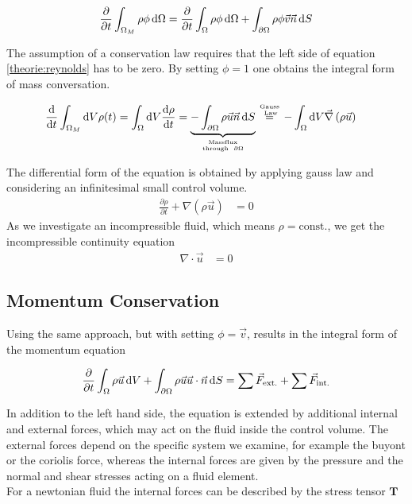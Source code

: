 \begin{align}
    \label{theorie:reynolds}
    \pdn[]{t} \int_{\Omega_M} \rho \phi \dif \Omega = \pdn[]{t}\int_{\Omega} \rho \phi \dif \Omega + \int_{\partial\Omega} \rho \phi \vec{v} \vec{n} \dif S
\end{align}

The assumption of a conservation law requires that the left side of equation \ref{theorie:reynolds} has to be zero.
By setting $\phi = 1$ one obtains the integral form of mass conversation.

\begin{align}
    \frac{\dif}{\dif t} \int_{\Omega_M}\dif V \rho(t) =  \int_{\Omega}\dif V \frac{\dif \rho}{\dif t}  &= \underbrace{-\int_{\partial \Omega}
     \rho \vec{u}\vec{n}\dif S}_{\text{Massflux} \atop \text{through \ } \partial \Omega} \stackrel{\text{Gauss} \atop \text{ Law}}{=}
      -\int_\Omega \dif V \vec{\nabla}\left(\rho \vec{u}\right)
\end{align}

The differential form of the equation is obtained by applying gauss law and considering an infinitesimal small control volume.
\begin{align}
     \frac{\partial \rho}{\partial t}  + \nabla \left(\rho \vec{u}\right) &= 0
\end{align}
As we investigate an incompressible fluid, which means $\rho = \text{const.}$, we get the incompressible continuity equation
\begin{align}
     \nabla \cdot \vec{u} &= 0
\end{align}

\subsection{Momentum Conservation}

Using the same approach, but with setting $\phi = \vec{v}$, results in the integral form of the momentum equation

\begin{align}
    \label{theorie:intimpulse}
    \pdn[]{t} \int_\Omega \rho \vec{u}\dif V + \int_{\partial\Omega} \rho\vec{u}\vec{u}\cdot \vec{n} \dif S =  \sum \vec{F}_{\text{ext.}} + \sum \vec{F}_{\text{int.}}
\end{align}

In addition to the left hand side, the equation is extended by additional internal and external forces, which may act on the fluid inside the control volume.
The external forces depend on the specific system  we examine, for example the buyont or the coriolis force, whereas the internal forces
are given by the pressure and the normal and shear stresses acting on a fluid element.\\
For a newtonian fluid the internal forces can be described by the stress tensor $\bm{T}$

